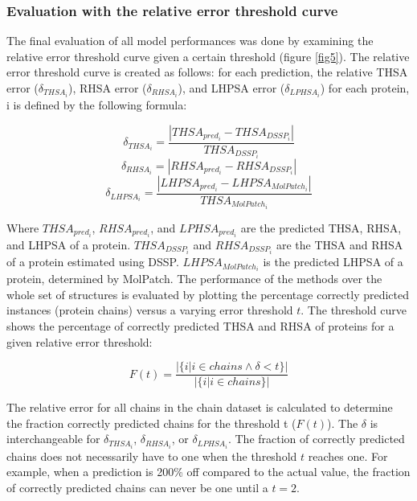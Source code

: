 \documentclass[11pt,a4paper]{article}
\begin{document}
\subsubsection{Evaluation with the relative error threshold curve}
The final evaluation of all model performances was done by examining the relative error threshold curve given a certain threshold (figure \ref{fig5}). The relative error threshold curve is created as follows: for each prediction, the relative THSA error ($\delta_{THSA_{i}}$), RHSA error ($\delta_{RHSA_{i}}$), and LHPSA error ($\delta_{LPHSA_{i}}$) for each protein, i is defined by the following formula:

\begin{equation}
\delta_{THSA_{i}} = \frac{\left | THSA_{pred_{i}} - THSA_{DSSP_i}\right |}{THSA_{DSSP_i}}
\end{equation}
\setlength\belowdisplayskip{2pt}
\begin{equation}
\delta_{RHSA_{i}} = \left | RHSA_{pred_{i}} - RHSA_{DSSP_i}\right |
\end{equation}
\setlength\belowdisplayskip{2pt}
\begin{equation}
\delta_{LHPSA_{i}} = \frac{\left | LHPSA_{pred_{i}} - LHPSA_{MolPatch_i}\right |}{THSA_{MolPatch_i}}
\end{equation}
\setlength\belowdisplayskip{10pt}

Where $THSA_{pred_{i}}$, $RHSA_{pred_{i}}$, and $LPHSA_{pred_{i}}$ are the predicted THSA, RHSA, and LHPSA of a protein. $THSA_{DSSP_i}$ and $RHSA_{DSSP_i}$ are the THSA and RHSA of a protein estimated using DSSP. $LHPSA_{MolPatch_{i}}$ is the predicted LHPSA of a protein, determined by MolPatch. The performance of the methods over the whole set of structures is evaluated by plotting the percentage correctly predicted instances (protein chains) versus a varying error threshold $t$. The threshold curve shows the percentage of correctly predicted THSA and RHSA of proteins for a given relative error threshold:

\begin{equation}
F(t) = \frac{\left | \{ i|i \in chains \wedge \delta<t \} \right |}{|\{i|i \in chains\}|}\end{equation}
\setlength\belowdisplayskip{4pt}

The relative error for all chains in the chain dataset is calculated to determine the fraction correctly predicted chains for the threshold t  ($F(t)$). The $\delta$ is interchangeable for $\delta_{THSA_{i}}$, $\delta_{RHSA_{i}}$, or $\delta_{LPHSA_{i}}$. The fraction of correctly predicted chains does not necessarily have to one when the threshold $t$ reaches one. For example, when a prediction is 200\% off compared to the actual value, the fraction of correctly predicted chains can never be one until a $t=2$.
\end{document}
